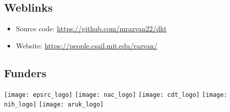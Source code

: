 \documentclass[portrait,a0,final,20pt]{a0poster}
\begin{document}
\begin{multicols}{2}

\Large{

\raggedcolumns	


\vspace{-1em}
\subsection*{Weblinks}
\begin{itemize}
\item Source code: \url{https://github.com/mrazvan22/dkt}
\item Website: \url{https://people.csail.mit.edu/razvan/}
\end{itemize}
}



\columnbreak

\subsection*{Funders}

\vspace{0em}
\newcommand{\heightLogos}{3.5cm}
\texttt{[image: epsrc\_logo]}
\hspace{0.5em}
\texttt{[image: nac\_logo]} 
\hspace{0.5em}
\texttt{[image: cdt\_logo]} 
\hspace{0.5em}
\texttt{[image: nih\_logo]} 
\hspace{0.5em}
\texttt{[image: aruk\_logo]} 
\hspace{0.5em}




\end{multicols}
\end{document}

